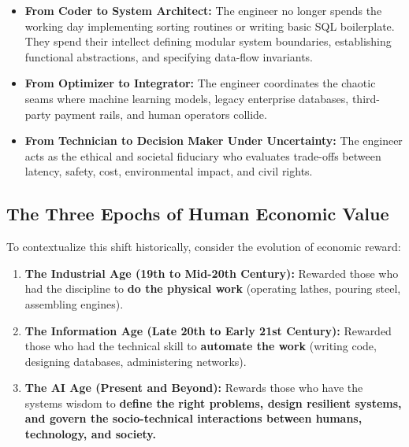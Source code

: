 \begin{center}
\end{center}

\begin{itemize}[leftmargin=1.5em]
    \item \textbf{From Coder to System Architect:} The engineer no longer spends the working day implementing sorting routines or writing basic SQL boilerplate. They spend their intellect defining modular system boundaries, establishing functional abstractions, and specifying data-flow invariants.
    \item \textbf{From Optimizer to Integrator:} The engineer coordinates the chaotic seams where machine learning models, legacy enterprise databases, third-party payment rails, and human operators collide.
    \item \textbf{From Technician to Decision Maker Under Uncertainty:} The engineer acts as the ethical and societal fiduciary who evaluates trade-offs between latency, safety, cost, environmental impact, and civil rights.
\end{itemize}

\subsection{The Three Epochs of Human Economic Value}
To contextualize this shift historically, consider the evolution of economic reward:
\begin{enumerate}[leftmargin=2em]
    \item \textbf{The Industrial Age (19th to Mid-20th Century):} Rewarded those who had the discipline to \textbf{do the physical work} (operating lathes, pouring steel, assembling engines).
    \item \textbf{The Information Age (Late 20th to Early 21st Century):} Rewarded those who had the technical skill to \textbf{automate the work} (writing code, designing databases, administering networks).
    \item \textbf{The AI Age (Present and Beyond):} Rewards those who have the systems wisdom to \textbf{define the right problems, design resilient systems, and govern the socio-technical interactions between humans, technology, and society.}
\end{enumerate}

